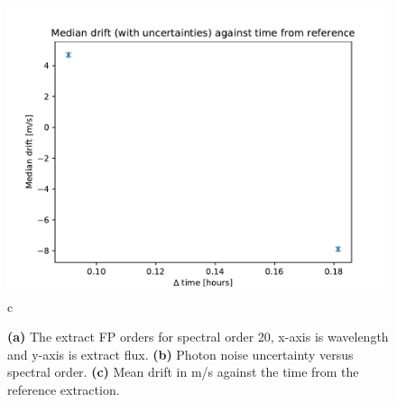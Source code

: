 \begin{figure}
\begin{center}
\begin{minipage}{.495\textwidth}
\begin{center}
\includegraphics[width=\textwidth]{Figures/cal_drift_raw_3.pdf}
c
\end{center}
\end{minipage}%
\end{center}

\caption{\textbf{(a)} The extract FP orders for spectral order 20, x-axis is wavelength and y-axis is extract flux. \textbf{(b)} Photon noise uncertainty versus spectral order. \textbf{(c)} Mean drift in m/s against the time from the reference extraction. \label{figure:cal_drift_raw}}
\end{figure}